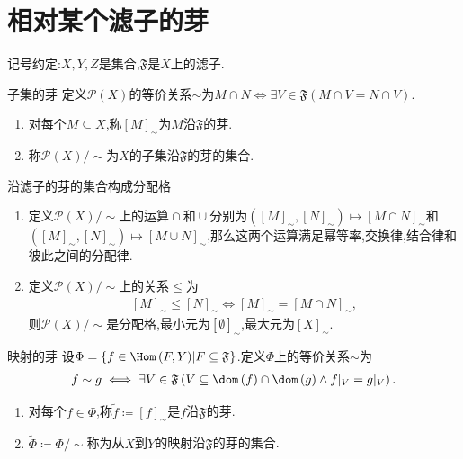\section{相对某个滤子的芽}

记号约定:$X,Y,Z$是集合,$\mathfrak{F}$是$X$上的滤子.

\begin{definition}{子集的芽}{}
	定义$\mathcal{P}\left(X\right)$的等价关系$\sim$为$M\cap N\iff\exists V\in\mathfrak{F}\left(M\cap V=N\cap V\right)$.
	\begin{enumerate}
		\item 对每个$M\subseteq X$,称$\left[M\right]_{\sim}$为$M$沿$\mathfrak{F}$的芽.
		\item 称$\mathcal{P}\left(X\right)/\sim$为$X$的子集沿$\mathfrak{F}$的芽的集合.
	\end{enumerate}
\end{definition}

\begin{proposition}{沿滤子的芽的集合构成分配格}{}
	\begin{enumerate}
		\item 定义$\mathcal{P}\left(X\right)/\sim$上的运算$\bar{\cap}$和$\bar{\cup}$分别为$\left(\left[M\right]_{\sim},\left[N\right]_{\sim}\right)\mapsto\left[M\cap N\right]_{\sim}$和$\left(\left[M\right]_{\sim},\left[N\right]_{\sim}\right)\mapsto\left[M\cup N\right]_{\sim}$,那么这两个运算满足幂等率,交换律,结合律和彼此之间的分配律.
		\item 定义$\mathcal{P}\left(X\right)/\sim$上的关系$\leq$为
		\begin{align*}
			\left[M\right]_{\sim}\leq\left[N\right]_{\sim}\iff\left[M\right]_{\sim}=\left[M\cap N\right]_{\sim},
		\end{align*}
		则$\mathcal{P}\left(X\right)/\sim$是分配格,最小元为$\left[\emptyset\right]_{\sim}$,最大元为$\left[X\right]_{\sim}$.
	\end{enumerate}
\end{proposition}

\begin{definition}{映射的芽}{}
	设$\Phi=\left\{f\in\Hom\left(F,Y\right)\middle|F\subseteq\mathfrak{F}\right\}$.定义$\Phi$上的等价关系$\sim$为
	\begin{align*}
		f\sim g\iff\exists V\in\mathfrak{F}\left(V\subseteq\dom\left(f\right)\cap\dom\left(g\right)\wedge f|_{V}=g|_{V}\right).
	\end{align*}
	\begin{enumerate}
		\item 对每个$f\in\Phi$,称$\tilde{f}\coloneq\left[f\right]_{\sim}$是$f$沿$\mathfrak{F}$的芽.
		\item $\tilde{\Phi}\coloneq\Phi/\sim$称为从$X$到$Y$的映射沿$\mathfrak{F}$的芽的集合.
	\end{enumerate}
\end{definition}

